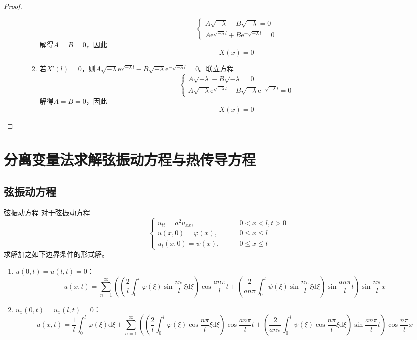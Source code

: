 \documentclass[lang = cn, scheme = chinese, thmcnt = section]{elegantbook}
\newcommand{\dd}{\mathrm{d}}           %
\newcommand{\ee}[1]{\mathrm{e}^{#1}}   %
\begin{document}
\begin{proof}
\begin{enumerate}
\begin{enumerate}
\begin{enumerate}
				$$
				\begin{cases}
					A\sqrt{-\lambda}-B\sqrt{-\lambda}=0\\
					A\ee{\sqrt{-\lambda}l}+B\ee{-\sqrt{-\lambda}l}=0
				\end{cases}
				$$
				解得$A=B=0$，因此
				$$
				X(x)=0
				$$
				\item 若$X'(l)=0$，则$A\sqrt{-\lambda}\ee{\sqrt{-\lambda}l}-B\sqrt{-\lambda}\ee{-\sqrt{-\lambda}l}=0$。联立方程%
				$$
				\begin{cases}
					A\sqrt{-\lambda}-B\sqrt{-\lambda}=0\\
					A\sqrt{-\lambda}\ee{\sqrt{-\lambda}l}-B\sqrt{-\lambda}\ee{-\sqrt{-\lambda}l}=0
				\end{cases}
				$$
				解得$A=B=0$，因此
				$$
				X(x)=0
				$$
			\end{enumerate}
		\end{enumerate}
	\end{enumerate}
\end{proof}

\section{分离变量法求解弦振动方程与热传导方程}

\subsection{弦振动方程}

\begin{theorem}{弦振动方程}
	对于弦振动方程
	$$
	\begin{cases}
		u_{tt}=a^2u_{xx},\qquad & 0<x<l,t>0\\
		u(x,0)=\varphi(x),\qquad & 0\le x\le l\\
		u_t(x,0)=\psi(x),\qquad & 0\le x\le l
	\end{cases}
	$$
	求解加之如下边界条件的形式解。
	\begin{enumerate}
		\item $u(0,t)=u(l,t)=0$：
		$$
		u(x,t)=\sum_{n=1}^{\infty}\left(\left(\frac{2}{l}\int_0^l\varphi(\xi)\sin\frac{n\pi }{l}\xi\dd \xi\right)\cos\frac{an\pi}{l}t+\left(\frac{2}{an\pi}\int_0^l\psi(\xi)\sin\frac{n\pi }{l}\xi\dd \xi\right)\sin \frac{an\pi}{l}t\right)\sin\frac{n\pi}{l}x
		$$
		\item $u_x(0,t)=u_x(l,t)=0$：
		{\scriptsize{
				$$
				u(x,t)=\frac{1}{l}\int_0^l\varphi(\xi)\dd \xi+\sum_{n=1}^{\infty}\left(\left(\frac{2}{l}\int_0^l\varphi(\xi)\cos\frac{n\pi }{l}\xi\dd \xi\right)\cos\frac{an\pi}{l}t+\left(\frac{2}{an\pi}\int_0^l\psi(\xi)\cos\frac{n\pi }{l}\xi\dd \xi\right)\sin \frac{an\pi}{l}t\right)\cos\frac{n\pi}{l}x
				$$
		}}
	\end{enumerate}
\end{theorem}
\end{document}
